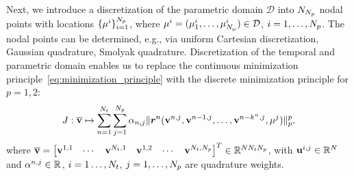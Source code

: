\documentclass[3p,computermodern,10pt]{elsarticle}
\begin{document}
Next, we introduce a discretization of the parametric domain $\mathcal{D}$ into $N_{N_p}$ nodal points with locations $\{ \mathbf{\mu}^i \}_{i = 1}^{N_p}$, where $\mathbf{\mu}^i = (\mathbf{\mu}^i_1 , \ldots,\mathbf{\mu}^i_{N_{\mu}}) \in \mathcal{D}$, $i=1,\ldots,N_p$. The nodal points can be determined, e.g., via uniform Cartesian discretization, Gaussian quadrature, Smolyak quadrature. Discretization of the temporal and parametric domain enables us to replace the continuous minimization principle~\eqref{eq:minimization_principle} with the discrete minimization principle for $p=1,2$:
 \begin{equation}\label{eq:discrete_minimization_principle}
J : \overline{\mathbf{v}}  \mapsto \sum_{n=1}^{N_t}  \sum_{j=1}^{N_p} \alpha_{n,j} \| \boldsymbol{r}^n (\mathbf{v}^{n,j},\mathbf{v}^{n-1,j},\ldots,\mathbf{v}^{n-k^n,j},\mathbf{\mu}^j) \|_{p}^p,
\end{equation}
where $\overline{\mathbf{v}} =  \begin{bmatrix} \mathbf{v}^{1,1} & \cdots & \mathbf{v}^{N_t,1} & \mathbf{v}^{1,2} & \cdots & \mathbf{v}^{N_t,N_p} \end{bmatrix}^T \in \mathbb{R}^{N N_t N_p}$, with $\mathbf{u}^{i,j} \in \mathbb{R}^{N}$ and $\alpha^{n,j} \in \mathbb{R}^{}$, $i=1\dots,N_t$, $j=1,\ldots,N_p$ are quadrature weights. 
\end{document}
